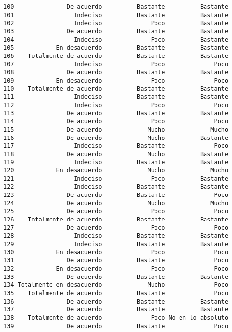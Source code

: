 \documentclass[
  letterpaper,
  DIV=11,
  numbers=noendperiod]{scrartcl}
\begin{document}
\begin{verbatim}
100               De acuerdo          Bastante          Bastante
101                 Indeciso          Bastante          Bastante
102                 Indeciso              Poco          Bastante
103               De acuerdo          Bastante          Bastante
104                 Indeciso              Poco          Bastante
105            En desacuerdo          Bastante          Bastante
106    Totalmente de acuerdo          Bastante          Bastante
107                 Indeciso              Poco              Poco
108               De acuerdo          Bastante          Bastante
109            En desacuerdo              Poco              Poco
110    Totalmente de acuerdo          Bastante          Bastante
111                 Indeciso          Bastante          Bastante
112                 Indeciso              Poco              Poco
113               De acuerdo          Bastante          Bastante
114               De acuerdo              Poco              Poco
115               De acuerdo             Mucho             Mucho
116               De acuerdo             Mucho          Bastante
117                 Indeciso          Bastante              Poco
118               De acuerdo             Mucho          Bastante
119                 Indeciso          Bastante          Bastante
120            En desacuerdo             Mucho             Mucho
121                 Indeciso              Poco          Bastante
122                 Indeciso          Bastante          Bastante
123               De acuerdo          Bastante              Poco
124               De acuerdo             Mucho             Mucho
125               De acuerdo              Poco              Poco
126    Totalmente de acuerdo          Bastante          Bastante
127               De acuerdo              Poco              Poco
128                 Indeciso          Bastante          Bastante
129                 Indeciso          Bastante          Bastante
130            En desacuerdo              Poco              Poco
131               De acuerdo          Bastante              Poco
132            En desacuerdo              Poco              Poco
133               De acuerdo          Bastante          Bastante
134 Totalmente en desacuerdo             Mucho              Poco
135    Totalmente de acuerdo          Bastante              Poco
136               De acuerdo          Bastante          Bastante
137               De acuerdo          Bastante          Bastante
138    Totalmente de acuerdo              Poco No en lo absoluto
139               De acuerdo          Bastante              Poco

\end{verbatim}
\end{document}
